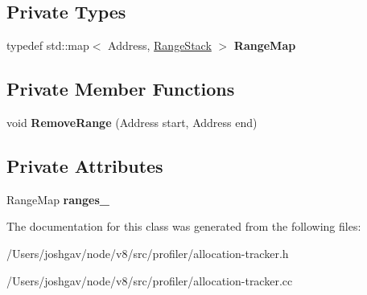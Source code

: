 \subsection*{Private Types}
\begin{DoxyCompactItemize}
\item 
typedef std\+::map$<$ Address, \hyperlink{structv8_1_1internal_1_1_address_to_trace_map_1_1_range_stack}{Range\+Stack} $>$ {\bfseries Range\+Map}\hypertarget{classv8_1_1internal_1_1_address_to_trace_map_afd65f8eb3d8a0b639299248866bec150}{}\label{classv8_1_1internal_1_1_address_to_trace_map_afd65f8eb3d8a0b639299248866bec150}

\end{DoxyCompactItemize}
\subsection*{Private Member Functions}
\begin{DoxyCompactItemize}
\item 
void {\bfseries Remove\+Range} (Address start, Address end)\hypertarget{classv8_1_1internal_1_1_address_to_trace_map_a5fced099832218b998c2bb3ab6de9906}{}\label{classv8_1_1internal_1_1_address_to_trace_map_a5fced099832218b998c2bb3ab6de9906}

\end{DoxyCompactItemize}
\subsection*{Private Attributes}
\begin{DoxyCompactItemize}
\item 
Range\+Map {\bfseries ranges\+\_\+}\hypertarget{classv8_1_1internal_1_1_address_to_trace_map_ad84aa834e379d1a872155acc3811b23c}{}\label{classv8_1_1internal_1_1_address_to_trace_map_ad84aa834e379d1a872155acc3811b23c}

\end{DoxyCompactItemize}


The documentation for this class was generated from the following files\+:\begin{DoxyCompactItemize}
\item 
/\+Users/joshgav/node/v8/src/profiler/allocation-\/tracker.\+h\item 
/\+Users/joshgav/node/v8/src/profiler/allocation-\/tracker.\+cc\end{DoxyCompactItemize}
